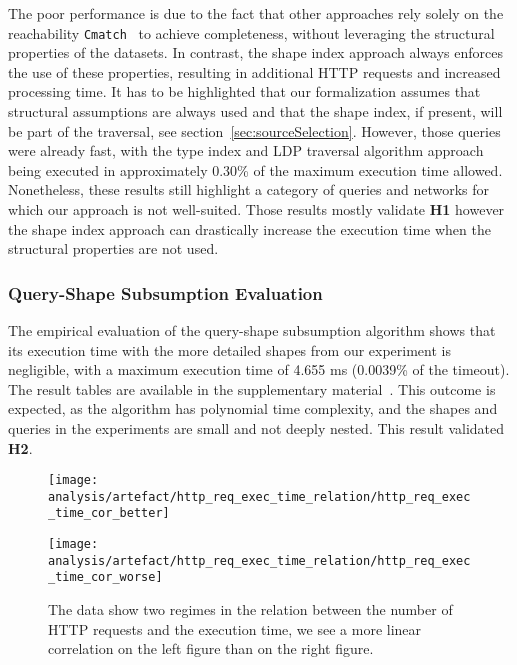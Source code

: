 The poor performance is due to the fact that other approaches rely solely on the reachability \texttt{Cmatch}~\cite{hartig2016walking} to achieve completeness, without leveraging the structural properties of the datasets.
In contrast, the shape index approach always enforces the use of these properties, resulting in additional HTTP requests and increased processing time.
It has to be highlighted that our formalization assumes that structural assumptions are always used and that the shape index, if present, will be part of the traversal, see section~\ref{sec:sourceSelection}.
However, those queries were already fast, with the type index and LDP traversal algorithm approach being executed in approximately 0.30\% of the maximum execution time allowed.
Nonetheless, these results still highlight a category of queries and networks for which our approach is not well-suited.
Those results mostly validate \textbf{H1} however the shape index approach can drastically increase the execution time when the structural properties are not used.

\subsubsection{Query-Shape Subsumption Evaluation}
The empirical evaluation of the query-shape subsumption algorithm shows that its execution time with the more detailed shapes from our experiment is negligible, with a maximum execution time of 4.655 ms (0.0039\% of the timeout).
The result tables are available in the supplementary material~\hyperref[sf:complementaryMaterial]{}.
This outcome is expected, as the algorithm has polynomial time complexity, and the shapes and queries in the experiments are small and not deeply nested.
This result validated \textbf{H2}.

\iffalse
\begin{figure}[htbp]
    \centering
    \begin{minipage}[t]{0.40\linewidth}
        \centering
        \texttt{[image: analysis/artefact/http\_req\_exec\_time\_relation/http\_req\_exec\_time\_cor\_better]}
        \label{fig:http_req_exec_time_cor_better}
    \end{minipage}
    \hspace{0.05\textwidth}
    \begin{minipage}[t]{0.40\linewidth}
        \centering
        \texttt{[image: analysis/artefact/http\_req\_exec\_time\_relation/http\_req\_exec\_time\_cor\_worse]}
        \label{fig:http_req_exec_time_cor_worse}
    \end{minipage}

    \caption{
        The data show two regimes in the relation between the number of HTTP requests and the execution time, 
        we see a more linear correlation on the left figure than on the right figure.
        }
    \label{fig:http_req_exec_time_cor}
\end{figure}

